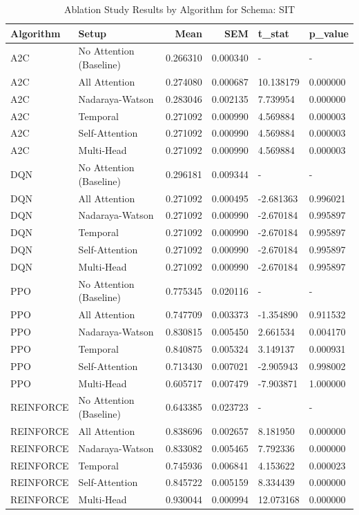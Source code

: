 \documentclass{article}
\begin{document}
\begin{table}[ht]
\centering
\caption{Ablation Study Results by Algorithm for Schema: SIT}
\begin{tabular}{llrrll}
\toprule
Algorithm & Setup & Mean & SEM & t\_stat & p\_value \\
\midrule
A2C & No Attention (Baseline) & 0.266310 & 0.000340 & - & - \\
A2C & All Attention & 0.274080 & 0.000687 & 10.138179 & 0.000000 \\
A2C & Nadaraya-Watson & 0.283046 & 0.002135 & 7.739954 & 0.000000 \\
A2C & Temporal & 0.271092 & 0.000990 & 4.569884 & 0.000003 \\
A2C & Self-Attention & 0.271092 & 0.000990 & 4.569884 & 0.000003 \\
A2C & Multi-Head & 0.271092 & 0.000990 & 4.569884 & 0.000003 \\
DQN & No Attention (Baseline) & 0.296181 & 0.009344 & - & - \\
DQN & All Attention & 0.271092 & 0.000495 & -2.681363 & 0.996021 \\
DQN & Nadaraya-Watson & 0.271092 & 0.000990 & -2.670184 & 0.995897 \\
DQN & Temporal & 0.271092 & 0.000990 & -2.670184 & 0.995897 \\
DQN & Self-Attention & 0.271092 & 0.000990 & -2.670184 & 0.995897 \\
DQN & Multi-Head & 0.271092 & 0.000990 & -2.670184 & 0.995897 \\
PPO & No Attention (Baseline) & 0.775345 & 0.020116 & - & - \\
PPO & All Attention & 0.747709 & 0.003373 & -1.354890 & 0.911532 \\
PPO & Nadaraya-Watson & 0.830815 & 0.005450 & 2.661534 & 0.004170 \\
PPO & Temporal & 0.840875 & 0.005324 & 3.149137 & 0.000931 \\
PPO & Self-Attention & 0.713430 & 0.007021 & -2.905943 & 0.998002 \\
PPO & Multi-Head & 0.605717 & 0.007479 & -7.903871 & 1.000000 \\
REINFORCE & No Attention (Baseline) & 0.643385 & 0.023723 & - & - \\
REINFORCE & All Attention & 0.838696 & 0.002657 & 8.181950 & 0.000000 \\
REINFORCE & Nadaraya-Watson & 0.833082 & 0.005465 & 7.792336 & 0.000000 \\
REINFORCE & Temporal & 0.745936 & 0.006841 & 4.153622 & 0.000023 \\
REINFORCE & Self-Attention & 0.845722 & 0.005159 & 8.334439 & 0.000000 \\
REINFORCE & Multi-Head & 0.930044 & 0.000994 & 12.073168 & 0.000000 \\
\bottomrule
\end{tabular}
\end{table}
\end{document}
